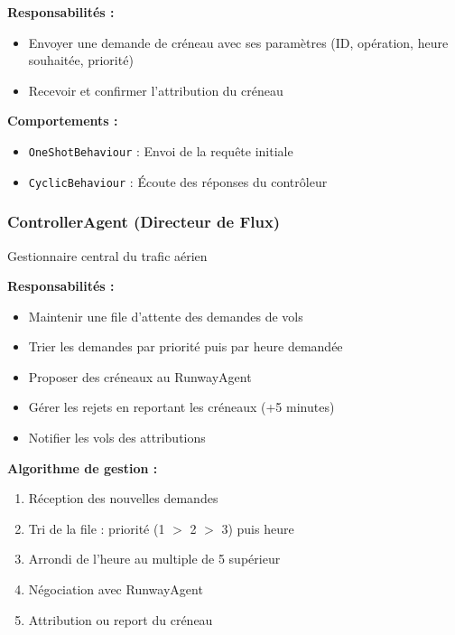 \documentclass[12pt,a4paper]{article}
\begin{document}
\textbf{Responsabilités :}
\begin{itemize}[leftmargin=*]
    \item Envoyer une demande de créneau avec ses paramètres (ID, opération, heure souhaitée, priorité)
    \item Recevoir et confirmer l'attribution du créneau
\end{itemize}

\textbf{Comportements :}
\begin{itemize}[leftmargin=*]
    \item \texttt{OneShotBehaviour} : Envoi de la requête initiale
    \item \texttt{CyclicBehaviour} : Écoute des réponses du contrôleur
\end{itemize}

\subsubsection{ControllerAgent (Directeur de Flux)}

\begin{tcolorbox}[colback=lightblue!15, colframe=primaryblue, title=\textbf{Rôle}]
Gestionnaire central du trafic aérien
\end{tcolorbox}

\textbf{Responsabilités :}
\begin{itemize}[leftmargin=*]
    \item Maintenir une file d'attente des demandes de vols
    \item Trier les demandes par priorité puis par heure demandée
    \item Proposer des créneaux au RunwayAgent
    \item Gérer les rejets en reportant les créneaux (+5 minutes)
    \item Notifier les vols des attributions
\end{itemize}

\textbf{Algorithme de gestion :}
\begin{enumerate}[leftmargin=*, label=\textcolor{primaryblue}{\arabic*.}]
    \item Réception des nouvelles demandes
    \item Tri de la file : priorité (1 $>$ 2 $>$ 3) puis heure
    \item Arrondi de l'heure au multiple de 5 supérieur
    \item Négociation avec RunwayAgent
    \item Attribution ou report du créneau
\end{enumerate}
\end{document}
